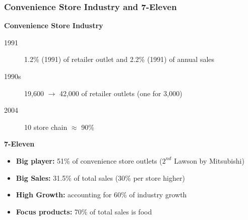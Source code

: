 \documentclass[10pt,handout,notes=show]{beamer}
\begin{document}
\begin{frame}
  \frametitle{Convenience Store Industry and 7-Eleven}

  \textbf{Convenience Store Industry}
  \begin{description}
    \item[1991] 1.2\% (1991) of retailer outlet and 2.2\% (1991) of annual sales
    \item[1990s] 19,600 $\rightarrow$ 42,000 of retailer outlets (one for 3,000)
    \item[2004] 10 store chain $\approx$ 90\%
  \end{description}

  \NextLine
  \textbf{7-Eleven}
  \begin{itemize}
    \item \textbf{Big player:} 51\% of convenience store outlets ($2^{nd}$ Lawson by Mitsubishi)
    \item \textbf{Big Sales:} 31.5\% of total sales (30\% per store higher)
    \item \textbf{High Growth:} accounting for 60\% of industry growth
    \item \textbf{Focus products:} 70\% of total sales is food
  \end{itemize}

\end{frame}
\end{document}
